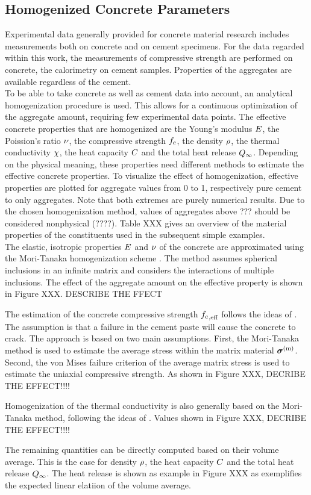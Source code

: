 \subsection{Homogenized Concrete Parameters}
Experimental data generally provided for concrete material research includes measurements both on concrete and on cement specimens.
For the data regarded within this work, the measurements of compressive strength are performed on concrete, the calorimetry on cement samples.
Properties of the aggregates are available regardless of the cement.\\

To be able to take concrete as well as cement data into account, an analytical homogenization procedure is used.
This allows for a continuous optimization of the aggregate amount, requiring few experimental data points.
The effective concrete properties that are homogenized are the Young's modulus $E$, the Poission's ratio $\nu$, the compressive strength $f_{\text{c}}$, the density $\rho$, the thermal conductivity $\chi$, the heat capacity $C$ and the total heat release $Q_{\infty}$.
Depending on the physical meaning, these properties need different methods to estimate the effective concrete properties.
To visualize the effect of homogenization, effective properties are plotted for aggregate values from 0 to 1, respectively pure cement to only aggregates.
Note that both extremes are purely numerical results.
Due to the chosen homogenization method, values of aggregates above ??? should be considered nonphysical (????).
Table XXX gives an overview of the material properties of the constituents used in the subsequent simple examples.
\\

The elastic, isotropic properties $E$ and $\nu$ of the concrete are approximated using the Mori-Tanaka homogenization scheme \cite{mor_1973_asi}.
The method assumes spherical inclusions in an infinite matrix and considers the interactions of multiple inclusions.
The effect of the aggregate amount on the effective property is shown in Figure XXX.
DESCRIBE THE FFECT

The estimation of the concrete compressive strength ${f_{\text{c}}}_{,\text{eff}}$ follows the ideas of \cite{nev_2018_mcam}.
The assumption is that a failure in the cement paste will cause the concrete to crack.
The approach is based on two main assumptions.
First, the Mori-Tanaka method is used to estimate the average stress within the matrix material $\boldsymbol{\sigma}^{(\text{m})}$. 
Second, the von Mises failure criterion of the average matrix stress is used to estimate the uniaxial compressive strength.
As shown in Figure XXX, DECRIBE THE EFFECT!!!!

Homogenization of the thermal conductivity is also generally based on the Mori-Tanaka method, following the ideas of \cite{str_2011_mbeo}.
Values shown in Figure XXX, DECRIBE THE EFFECT!!!!

The remaining quantities can be directly computed based on their volume average.
This is the case for density $\rho$, the heat capacity $C$ and the total heat release $Q_{\infty}$.
The heat release is shown as example in Figure XXX as exemplifies the expected linear elatiion of the volume average.

